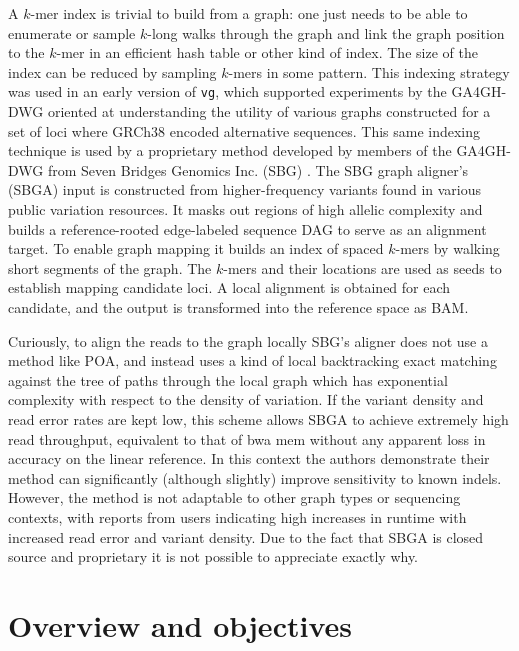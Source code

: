 A $k$-mer index is trivial to build from a graph: one just needs to be able to enumerate or sample $k$-long walks through the graph and link the graph position to the $k$-mer in an efficient hash table or other kind of index.
The size of the index can be reduced by sampling $k$-mers in some pattern.
This indexing strategy was used in an early version of {\tt vg}, which supported experiments by the GA4GH-DWG \cite{novak2017genome} oriented at understanding the utility of various graphs constructed for a set of loci where GRCh38 encoded alternative sequences.
This same indexing technique is used by a proprietary method developed by members of the GA4GH-DWG from Seven Bridges Genomics Inc. (SBG) \cite{rakocevic2018fast}.
The SBG graph aligner's (SBGA) input is constructed from higher-frequency variants found in various public variation resources.
It masks out regions of high allelic complexity and builds a reference-rooted edge-labeled sequence DAG to serve as an alignment target.
To enable graph mapping it builds an index of spaced $k$-mers by walking short segments of the graph.
The $k$-mers and their locations are used as seeds to establish mapping candidate loci.
A local alignment is obtained for each candidate, and the output is transformed into the reference space as BAM.

Curiously, to align the reads to the graph locally SBG's aligner does not use a method like POA, and instead uses a kind of local backtracking exact matching against the tree of paths through the local graph which has exponential complexity with respect to the density of variation.
If the variant density and read error rates are kept low, this scheme allows SBGA to achieve extremely high read throughput, equivalent to that of bwa mem without any apparent loss in accuracy on the linear reference.
In this context the authors demonstrate their method can significantly (although slightly) improve sensitivity to known indels.
However, the method is not adaptable to other graph types or sequencing contexts, with reports from users indicating high increases in runtime with increased read error and variant density.
Due to the fact that SBGA is closed source and proprietary it is not possible to appreciate exactly why.

\section{Overview and objectives}

